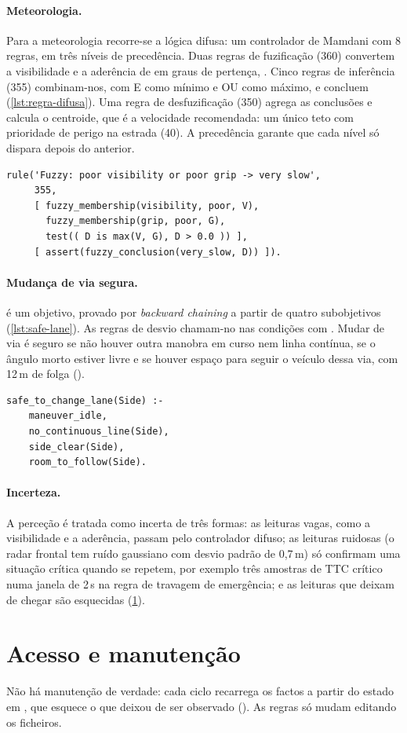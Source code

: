 \paragraph{Meteorologia.} Para a meteorologia recorre-se a lógica difusa: um
controlador de Mamdani com 8 regras, em três níveis de precedência. Duas regras
de fuzificação (360) convertem a visibilidade e a aderência de
 em graus de pertença, . Cinco regras de inferência (355) combinam-nos, com E como mínimo e OU
como máximo, e concluem 
(\cref{lst:regra-difusa}). Uma regra de desfuzificação (350) agrega as
conclusões e calcula o centroide, que é a velocidade recomendada: um único teto
 com prioridade de perigo na estrada (40). A precedência garante
que cada nível só dispara depois do anterior.

\begin{lstlisting}[caption={Uma regra de inferência difusa (\texttt{driving\_rules.pl})},label=lst:regra-difusa]
rule('Fuzzy: poor visibility or poor grip -> very slow',
     355,
     [ fuzzy_membership(visibility, poor, V),
       fuzzy_membership(grip, poor, G),
       test(( D is max(V, G), D > 0.0 )) ],
     [ assert(fuzzy_conclusion(very_slow, D)) ]).
\end{lstlisting}

\paragraph{Mudança de via segura.}  é um objetivo,
provado por \emph{backward chaining} a partir de quatro subobjetivos
(\cref{lst:safe-lane}). As regras de desvio chamam-no nas condições com
. Mudar de via é seguro se não houver
outra manobra em curso nem linha contínua, se o ângulo morto estiver livre e se
houver espaço para seguir o veículo dessa via, com 12\,m de folga
().

\begin{lstlisting}[caption={Objetivo provado por \emph{backward chaining} (\texttt{driving\_rules.pl})},label=lst:safe-lane]
safe_to_change_lane(Side) :-
    maneuver_idle,
    no_continuous_line(Side),
    side_clear(Side),
    room_to_follow(Side).
\end{lstlisting}

\paragraph{Incerteza.} A perceção é tratada como incerta de três formas: as
leituras vagas, como a visibilidade e a aderência, passam pelo controlador
difuso; as leituras ruidosas (o radar frontal tem ruído gaussiano com desvio
padrão de 0,7\,m) só confirmam uma situação crítica quando se repetem, por
exemplo três amostras de TTC crítico numa janela de 2\,s na regra de travagem
de emergência; e as leituras que deixam de chegar são esquecidas
(\cref{sec:base-manutencao}).

\section{Acesso e manutenção}
\label{sec:base-manutencao}

Não há manutenção de verdade: cada ciclo recarrega os factos a partir do estado em
, que esquece o que deixou de ser observado
(). As regras só mudam editando os ficheiros.
